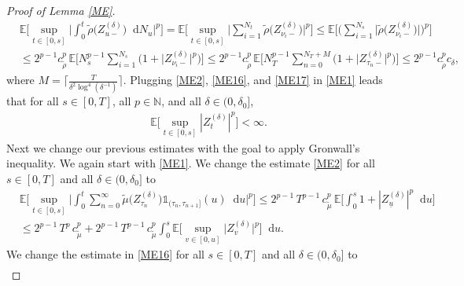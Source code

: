 \documentclass[11pt,a4paper]{article}
\numberwithin{equation}{section}
\theoremstyle{definition}
\newcommand{\E}{{\mathbb{E}}}
\newcommand{\N}{{\mathbb{N}}}
\newcommand{\diff}{\mathop{}\!\mathrm{d}}
\begin{document}
\begin{proof}[Proof of Lemma \ref{ME}]
\begin{equation}
    \begin{aligned}\label{ME17}
    &\E\Big[\sup_{t\in[0,s]}\Big|\int_0^t \widetilde \rho\big(Z^{(\delta)}_{u-}\big)\diff N_u\Big|^p\Big]
    = \E\Big[\sup_{t\in[0,s]}\Big| \sum_{i = 1}^{N_t} \widetilde \rho\big(Z^{(\delta)}_{\nu_i-}\big) \Big|^p\Big]
    \leq \E\Big[\Big( \sum_{i = 1}^{N_s} \big|\widetilde \rho\big(Z^{(\delta)}_{\nu_i-}\big)\big| \Big)^p\Big]\\
    &\leq 2^{p-1} c_{\widetilde\rho}^p\, \E\Big[N_s^{p-1} \sum_{i = 1}^{N_s} \big( 1+ \big|Z^{(\delta)}_{\nu_i-}\big|^p\big)\Big]
    \leq 2^{p-1} c_{\widetilde\rho}^p\, \E\Big[N_T^{p-1} \sum_{n=0}^{N_T +M} \big( 1+ \big|Z^{(\delta)}_{\tau_n-}\big|^p\big)\Big]
    \leq 2^{p-1} c_{\widetilde\rho}^p c_\delta,
\end{aligned}
\end{equation}
where $M = \Big\lceil \frac{T}{\delta^2 \log^4(\delta^{-1})} \Big\rceil$.
Plugging \eqref{ME2}, \eqref{ME16}, and \eqref{ME17} in \eqref{ME1} leads that for all $s\in[0,T]$, all $p\in\N$, and all $\delta\in(0,\delta_0]$,
\begin{equation}
    \begin{aligned}\label{ME18}
    &\E\Big[\sup_{t\in[0,s]} |Z^{(\delta)}_{t}|^p\Big]  <\infty.
\end{aligned}
\end{equation}
Next we change our previous estimates with the goal to apply Gronwall's inequality. We again start with \eqref{ME1}. We change the estimate \eqref{ME2} for all $s\in[0,T]$ and all $\delta\in(0,\delta_0]$ to 
\begin{equation}
    \begin{aligned}\label{ME19}
    &\E\Big[\sup_{t\in[0,s]}\Big|\int_0^t \sum_{n=0}^{\infty} \widetilde \mu\big(Z^{(\delta)}_{\tau_{n}}\big)\mathds{1}_{(\tau_n,\tau_{n+1}]}(u) \diff u\Big|^p\Big] 
   \leq 2^{p-1}\, T^{p-1}\, c_{\widetilde\mu}^p\, \E\Big[\int_0^s  1 + |Z^{(\delta)}_{\underline u}|^p \diff u\Big] \\
   &\leq  2^{p-1}\, T^{p}\, c_{\widetilde\mu}^p +  2^{p-1}\,T^{p-1}\, c_{\widetilde\mu}^p\int_0^s\E\Big[ \sup_{v\in[0,u]}  \big|Z^{(\delta)}_{v}\big|^p\Big]\diff u.
\end{aligned}
\end{equation}
We change the estimate in \eqref{ME16} for all $s\in[0,T]$ and all $\delta\in(0,\delta_0]$ to 
\begin{equation}
    \begin{aligned}\label{ME24}

\end{aligned}
\end{equation}
\end{proof}
\end{document}
